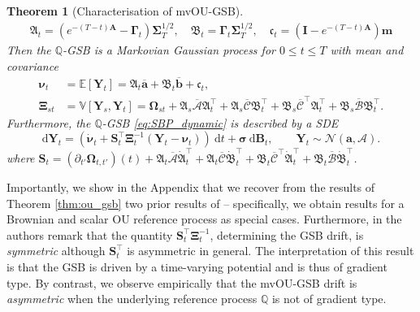 \documentclass{article}
\newcommand{\diff}{\mathrm{d}}
\newcommand{\E}{\mathbb{E}}
\newcommand{\V}{\mathbb{V}}
\newcommand{\Nc}{\mathcal{N}}
\newcommand{\Ac}{\mathcal{A}}
\newcommand{\Bc}{\mathcal{B}}
\newcommand{\Cc}{\mathcal{C}}
\newcommand{\bmathfrak}[1]{\bm{\mathfrak{#1}}}
\theoremstyle{newstyle}
\newtheorem{thm}{Theorem}
\begin{document}
\begin{thm}[Characterisation of mvOU-GSB]
\begin{align}
    \bmathfrak{A}_t = \left( e^{-(T-t)\bm{A}} - \bm{\Gamma}_t \right) \bm{\Sigma}_T^{1/2}, \quad \bmathfrak{B}_t = \bm{\Gamma}_t \bm{\Sigma}_T^{1/2}, \quad \bmathfrak{c}_t = \left(\bm{I} - e^{-(T-t)\bm{A}}\right) \bm{m}
  \end{align}
  Then the $\mathbb{Q}$-GSB is a Markovian Gaussian process for $0 \leq t \leq T$ with mean and covariance 
  \begin{align}
    \bm{\nu}_t &= \E[\bm{Y}_t] = \bmathfrak{A}_t \overline{\bm{a}} + \bmathfrak{B}_t \overline{\bm{b}} + \bmathfrak{c}_t, \\
    \bm{\Xi}_{st} &= \V[\bm{Y}_s, \bm{Y}_t] = \bm{\Omega}_{st} + \bmathfrak{A}_s \bm{\overline{\Ac}} \bmathfrak{A}_t^\top + \bmathfrak{A}_s \bm{\overline{\Cc}} \bmathfrak{B}_t^\top + \bmathfrak{B}_s \bm{\overline{\Cc}}^\top \bmathfrak{A}_t^\top + \bmathfrak{B}_s \bm{\overline{\Bc}} \bmathfrak{B}_t^\top. 
  \end{align}
  Furthermore, the $\mathbb{Q}$-GSB \eqref{eq:SBP_dynamic} is described by a SDE 
  \begin{equation}
    \diff \bm{Y}_t = \left( \dot{\bm{\nu}}_t + \bm{S}_t^\top \bm{\Xi}_t^{-1} (\bm{Y}_t - \bm{\nu}_t) \right) \: \diff t + \bm{\sigma} \: \diff \bm{B}_t, \qquad \bm{Y}_t \sim \Nc(\bm{a}, \bm{\Ac}). \label{eq:SBP_sde}
  \end{equation}
  where $\bm{S}_t = (\partial_{t'} \bm{\Omega}_{t, t'})(t) + \bmathfrak{A}_t \bm{\overline{\Ac}} \dot{\bmathfrak{A}}_t^\top + \bmathfrak{A}_t \bm{\overline{\Cc}} \dot{\bmathfrak{B}}_t^\top + \bmathfrak{B}_t \bm{\overline{\Cc}}^\top \dot{\bmathfrak{A}}_t^\top + \bmathfrak{B}_t \bm{\overline{\Bc}} \dot{\bmathfrak{B}}_t^\top$.
\end{thm}
Importantly, we show in the Appendix that we recover from the results of Theorem \ref{thm:ou_gsb} two prior results of \cite{bunne2023schrodinger} -- specifically, we obtain results for a Brownian and scalar OU reference process as special cases. Furthermore, in \cite{bunne2023schrodinger} the authors remark that the quantity $\bm{S}_t^\top \bm{\Xi}_t^{-1}$, determining the GSB drift, is \emph{symmetric} although $\bm{S}_t^\top$ is asymmetric in general. The interpretation of this result is that the GSB is driven by a time-varying potential and is thus of gradient type.
By contrast, we observe empirically that the mvOU-GSB drift is \emph{asymmetric} when the underlying reference process $\mathbb{Q}$ is not of gradient type. 
\end{document}
